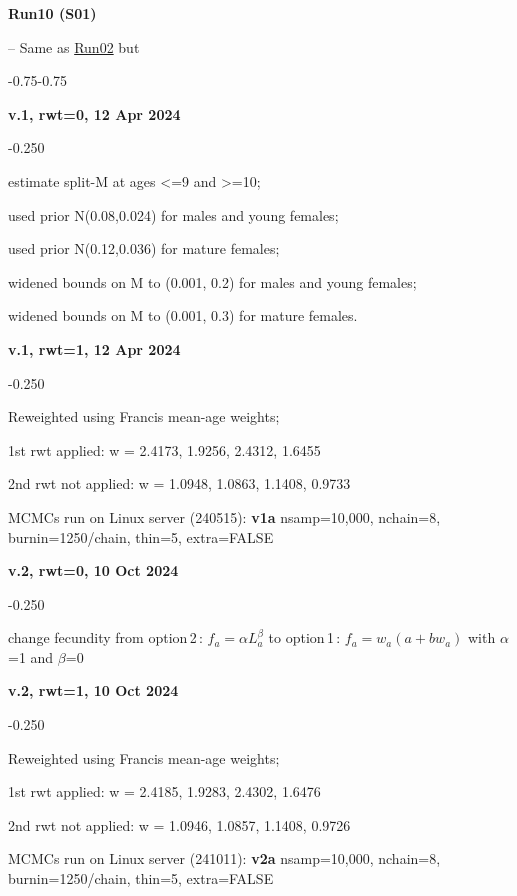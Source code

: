 \hypertarget{R10}{\textbf{Run10 (S01)}} -- Same as \hyperlink{R02}{Run02} but
\begin{itemize_csas}{-0.75}{-0.75}
	\item \textbf{v.1, rwt=0, 12 Apr 2024}
	\begin{itemize_csas}{-0.25}{0}
		\item estimate split-M at ages <=9 and >=10;
		\item used prior N(0.08,0.024) for males and young females;
		\item used prior N(0.12,0.036) for mature females;
		\item widened bounds on M to (0.001, 0.2) for males and young females;
		\item widened bounds on M to (0.001, 0.3) for mature females.
	\end{itemize_csas}
	\item \textbf{v.1, rwt=1, 12 Apr 2024}
	\begin{itemize_csas}{-0.25}{0}
		\item Reweighted using Francis mean-age weights;
		\item 1st rwt applied: w = 2.4173, 1.9256, 2.4312, 1.6455
		\item 2nd rwt not applied: w = 1.0948, 1.0863, 1.1408, 0.9733
		\item MCMCs run on Linux server (240515): \textbf{v1a} nsamp=10,000, nchain=8, burnin=1250/chain, thin=5, extra=FALSE
	\end{itemize_csas}
	\item \textbf{v.2, rwt=0, 10 Oct 2024}
	\begin{itemize_csas}{-0.25}{0}
		\item change fecundity from option\,2\,: $f_a = \alpha L_a^{\beta}$ to option\,1\,:  $f_a = w_a (a + b w_a)$ with $\alpha$=1 and $\beta$=0
	\end{itemize_csas}
	\item \textbf{v.2, rwt=1, 10 Oct 2024}
	\begin{itemize_csas}{-0.25}{0}
		\item Reweighted using Francis mean-age weights;
		\item 1st rwt applied: w = 2.4185, 1.9283, 2.4302, 1.6476
		\item 2nd rwt not applied: w = 1.0946, 1.0857, 1.1408, 0.9726
		\item MCMCs run on Linux server (241011): \textbf{v2a} nsamp=10,000, nchain=8, burnin=1250/chain, thin=5, extra=FALSE
	\end{itemize_csas}
\end{itemize_csas}

